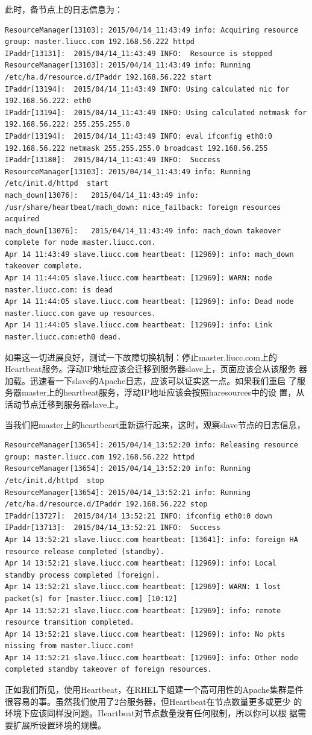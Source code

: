 此时，备节点上的日志信息为：

\begin{verbatim}
ResourceManager[13103]:	2015/04/14_11:43:49 info: Acquiring resource group: master.liucc.com 192.168.56.222 httpd
IPaddr[13131]:	2015/04/14_11:43:49 INFO:  Resource is stopped
ResourceManager[13103]:	2015/04/14_11:43:49 info: Running /etc/ha.d/resource.d/IPaddr 192.168.56.222 start
IPaddr[13194]:	2015/04/14_11:43:49 INFO: Using calculated nic for 192.168.56.222: eth0
IPaddr[13194]:	2015/04/14_11:43:49 INFO: Using calculated netmask for 192.168.56.222: 255.255.255.0
IPaddr[13194]:	2015/04/14_11:43:49 INFO: eval ifconfig eth0:0 192.168.56.222 netmask 255.255.255.0 broadcast 192.168.56.255
IPaddr[13180]:	2015/04/14_11:43:49 INFO:  Success
ResourceManager[13103]:	2015/04/14_11:43:49 info: Running /etc/init.d/httpd  start
mach_down[13076]:	2015/04/14_11:43:49 info: /usr/share/heartbeat/mach_down: nice_failback: foreign resources acquired
mach_down[13076]:	2015/04/14_11:43:49 info: mach_down takeover complete for node master.liucc.com.
Apr 14 11:43:49 slave.liucc.com heartbeat: [12969]: info: mach_down takeover complete.
Apr 14 11:44:05 slave.liucc.com heartbeat: [12969]: WARN: node master.liucc.com: is dead
Apr 14 11:44:05 slave.liucc.com heartbeat: [12969]: info: Dead node master.liucc.com gave up resources.
Apr 14 11:44:05 slave.liucc.com heartbeat: [12969]: info: Link master.liucc.com:eth0 dead.
\end{verbatim}

如果这一切进展良好，测试一下故障切换机制：停止master.liucc.com上的
Heartbeat服务。浮动IP地址应该会迁移到服务器slave上，页面应该会从该服务
器加载。迅速看一下slave的Apache日志，应该可以证实这一点。如果我们重启
了服务器master上的heartbeat服务，浮动IP地址应该会按照haresources中的设
置，从活动节点迁移到服务器slave上。

当我们把master上的heartbeart重新运行起来，这时，观察slave节点的日志信息，

\begin{verbatim}
ResourceManager[13654]:	2015/04/14_13:52:20 info: Releasing resource group: master.liucc.com 192.168.56.222 httpd
ResourceManager[13654]:	2015/04/14_13:52:20 info: Running /etc/init.d/httpd  stop
ResourceManager[13654]:	2015/04/14_13:52:21 info: Running /etc/ha.d/resource.d/IPaddr 192.168.56.222 stop
IPaddr[13727]:	2015/04/14_13:52:21 INFO: ifconfig eth0:0 down
IPaddr[13713]:	2015/04/14_13:52:21 INFO:  Success
Apr 14 13:52:21 slave.liucc.com heartbeat: [13641]: info: foreign HA resource release completed (standby).
Apr 14 13:52:21 slave.liucc.com heartbeat: [12969]: info: Local standby process completed [foreign].
Apr 14 13:52:21 slave.liucc.com heartbeat: [12969]: WARN: 1 lost packet(s) for [master.liucc.com] [10:12]
Apr 14 13:52:21 slave.liucc.com heartbeat: [12969]: info: remote resource transition completed.
Apr 14 13:52:21 slave.liucc.com heartbeat: [12969]: info: No pkts missing from master.liucc.com!
Apr 14 13:52:21 slave.liucc.com heartbeat: [12969]: info: Other node completed standby takeover of foreign resources.
\end{verbatim}

正如我们所见，使用Heartbeat，在RHEL下组建一个高可用性的Apache集群是件
很容易的事。虽然我们使用了2台服务器，但Heartbeat在节点数量更多或更少
的环境下应该同样没问题。Heartbeat对节点数量没有任何限制，所以你可以根
据需要扩展所设置环境的规模。

